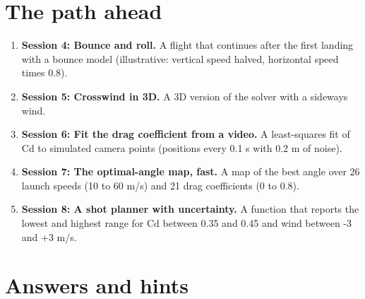 \documentclass[11pt,a4paper]{article}
\begin{document}
\section{The path ahead}
\begin{enumerate}[nosep]
\item \textbf{Session 4: Bounce and roll.} A flight that continues after the first landing with a bounce model (illustrative: vertical speed halved, horizontal speed times 0.8).
\item \textbf{Session 5: Crosswind in 3D.} A 3D version of the solver with a sideways wind.
\item \textbf{Session 6: Fit the drag coefficient from a video.} A least-squares fit of Cd to simulated camera points (positions every 0.1 s with 0.2 m of noise).
\item \textbf{Session 7: The optimal-angle map, fast.} A map of the best angle over 26 launch speeds (10 to 60 m/s) and 21 drag coefficients (0 to 0.8).
\item \textbf{Session 8: A shot planner with uncertainty.} A function that reports the lowest and highest range for Cd between 0.35 and 0.45 and wind between -3 and +3 m/s.
\end{enumerate}

\section{Answers and hints}
\end{document}
